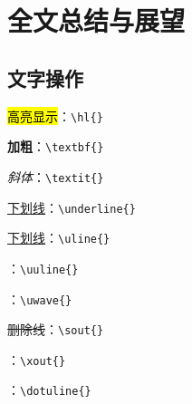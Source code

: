 %
% 
%


\chapter{全文总结与展望}\label{ch:6}

\section{文字操作}

\hl{高亮显示}：\verb|\hl{}|

\textbf{加粗}：\verb|\textbf{}|

\textit{斜体}：\verb|\textit{}|

\underline{下划线}：\verb|\underline{}|

\uline{下划线}：\verb|\uline{}| 

：\verb|\uuline{}|

：\verb|\uwave{}|

\sout{删除线}：\verb|\sout{}|

：\verb|\xout{}|

：\verb|\dotuline{}|

